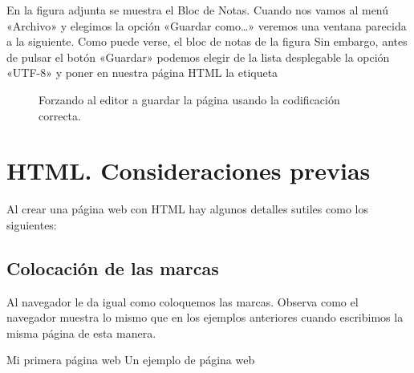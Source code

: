 \documentclass[a4paper,12pt,spanish]{sphinxmanual}
\begin{document}
En la figura adjunta se muestra el Bloc de Notas. Cuando nos vamos al menú «Archivo» y elegimos la opción «Guardar como…» veremos una ventana parecida a la siguiente. Como puede verse, el bloc de notas de la figura  Sin embargo, antes de pulsar el botón «Guardar» podemos elegir de la lista desplegable la opción «UTF-8» y poner en nuestra página HTML la etiqueta 

\begin{figure}[htbp]
\centering
\capstart

\noindent{}
\caption{Forzando al editor a guardar la página usando la codificación correcta.}\label{\detokenize{index:id9}}\end{figure}


\chapter{HTML. Consideraciones previas}
\label{\detokenize{index:html-consideraciones-previas}}
Al crear una página web con HTML hay algunos detalles sutiles como los siguientes:


\section{Colocación de las marcas}
\label{\detokenize{index:colocacion-de-las-marcas}}
Al navegador le da igual como coloquemos las marcas. Observa como el navegador muestra lo mismo que en los ejemplos anteriores cuando escribimos la misma página de esta manera.

%
\begin{sphinxVerbatim}[commandchars=\\\{\}]
     Mi primera página web
     Un ejemplo de página web   
\end{sphinxVerbatim}
\end{document}
